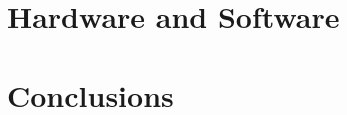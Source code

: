 \documentclass[letterpaper, aps, prd, superscriptaddress, showpacs, nofootinbib]{revtex4}
\begin{document}
\section{Hardware and Software}
\label{sec:hard_soft}

\section{Conclusions}
\label{sec:conclusion}





\end{document}
